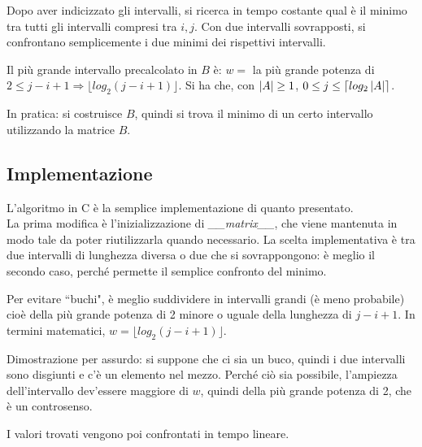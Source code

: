 Dopo aver indicizzato gli intervalli, si ricerca in tempo costante qual è il minimo tra tutti gli intervalli compresi tra $i, j$. Con due intervalli sovrapposti, si confrontano semplicemente i due minimi dei rispettivi intervalli.

Il più grande intervallo precalcolato in $B$ è: $w = $ la più grande potenza di $2 \leq j - i + 1 \Rightarrow \lfloor log_2(j - i + 1) \rfloor$. Si ha che, con $\left|A\right| \geq 1$, $0 \leq j \leq \lceil log_2 \left|A\right| \rceil$.

In pratica: si costruisce $B$, quindi si trova il minimo di un certo intervallo utilizzando la matrice $B$.

\subsection{Implementazione}
L'algoritmo in C è la semplice implementazione di quanto presentato. \\
La prima modifica è l'inizializzazione di \textit{\_\_matrix\_\_}, che viene mantenuta in modo tale da poter riutilizzarla quando necessario.
La scelta implementativa è tra due intervalli di lunghezza diversa o due che si sovrappongono: è meglio il secondo caso, perché permette il semplice confronto del minimo. 

Per evitare ``buchi", è meglio suddividere in intervalli grandi (è meno probabile) cioè della più grande potenza di 2 minore o uguale della lunghezza di $j - i + 1$. In termini matematici, $w = \lfloor log_2(j - i + 1) \rfloor$.

Dimostrazione per assurdo: si suppone che ci sia un buco, quindi i due intervalli sono disgiunti e c'è un elemento nel mezzo. Perché ciò sia possibile, l'ampiezza dell'intervallo dev'essere maggiore di $w$, quindi della più grande potenza di 2, che è un controsenso. 

I valori trovati vengono poi confrontati in tempo lineare.